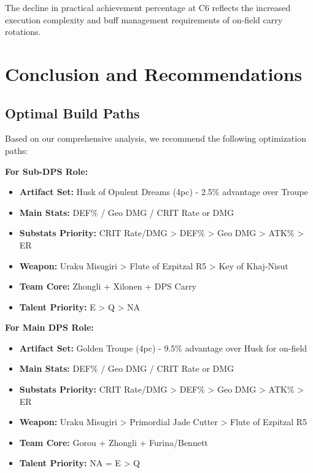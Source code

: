 \documentclass[12pt,a4paper]{article}
\begin{document}
The decline in practical achievement percentage at C6 reflects the increased execution complexity and buff management requirements of on-field carry rotations.

\section{Conclusion and Recommendations}

\subsection{Optimal Build Paths}

Based on our comprehensive analysis, we recommend the following optimization paths:

\begin{tcolorbox}[colback=c0color!5, colframe=c0color, title=C0 Chiori Recommendations]
\textbf{For Sub-DPS Role:}
\begin{itemize}
    \item \textbf{Artifact Set:} Husk of Opulent Dreams (4pc) - 2.5\% advantage over Troupe
    \item \textbf{Main Stats:} DEF\% / Geo DMG / CRIT Rate or DMG
    \item \textbf{Substats Priority:} CRIT Rate/DMG > DEF\% > Geo DMG > ATK\% > ER
    \item \textbf{Weapon:} Uraku Misugiri > Flute of Ezpitzal R5 > Key of Khaj-Nisut
    \item \textbf{Team Core:} Zhongli + Xilonen + DPS Carry
    \item \textbf{Talent Priority:} E > Q > NA
\end{itemize}
\end{tcolorbox}

\begin{tcolorbox}[colback=c6color!5, colframe=c6color, title=C6 Chiori Recommendations]
\textbf{For Main DPS Role:}
\begin{itemize}
    \item \textbf{Artifact Set:} Golden Troupe (4pc) - 9.5\% advantage over Husk for on-field
    \item \textbf{Main Stats:} DEF\% / Geo DMG / CRIT Rate or DMG
    \item \textbf{Substats Priority:} CRIT Rate/DMG > DEF\% > Geo DMG > ATK\% > ER
    \item \textbf{Weapon:} Uraku Misugiri > Primordial Jade Cutter > Flute of Ezpitzal R5
    \item \textbf{Team Core:} Gorou + Zhongli + Furina/Bennett
    \item \textbf{Talent Priority:} NA = E > Q
\end{itemize}
\end{tcolorbox}
\end{document}
